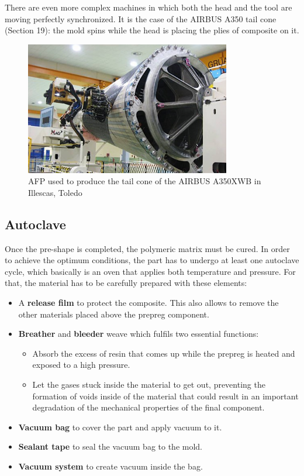 There are even more complex machines in which both the head and the tool are moving perfectly synchronized. It is the case of the AIRBUS A350 tail cone (Section 19): the mold spins while the head is placing the plies of composite on it.\\

\begin{figure}[h]
	\centering
	\includegraphics[width=0.8\textwidth]{img/AFP_airbus350XWB.png}
	\caption[AFP to produce tail cone of Airbus A350]{AFP used to produce the tail cone of the AIRBUS A350XWB in Illescas, Toledo}
	\label{fig:tail_cone_airbus}
\end{figure}

\subsection{Autoclave}

Once the pre-shape is completed, the polymeric matrix must be cured. In order to achieve the optimum conditions, the part has to undergo at least one autoclave cycle, which basically is an oven that applies both temperature and pressure. For that, the material has to be carefully prepared with these elements:
\begin{itemize}
\item A \textbf{release film} to protect the composite. This also allows to remove the other materials placed above the prepreg component.
\item \textbf{Breather} and \textbf{bleeder} weave which fulfils two essential functions:
\begin{itemize}
\item Absorb the excess of resin that comes up while the prepreg is heated and exposed to a high pressure.
\item Let the gases stuck inside the material to get out, preventing the formation of voids inside of the material that could result in an important degradation of the mechanical properties of the final component.
\end{itemize}
\item \textbf{Vacuum bag} to cover the part and apply vacuum to it.
\item \textbf{Sealant tape} to seal the vacuum bag to the mold.
\item \textbf{Vacuum system} to create vacuum inside the bag.
\end{itemize}

